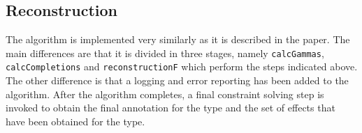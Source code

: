 \documentclass[8pt]{extarticle}
\begin{document}
\subsection{Reconstruction}
The algorithm is implemented very similarly as it is described in the paper. The main differences are that it is divided in three stages, namely \verb+calcGammas+, \verb+calcCompletions+ and \verb+reconstructionF+ which perform the steps indicated above. The other difference is that a logging and error reporting has been added to the algorithm. After the algorithm completes, a final constraint solving step is invoked to obtain the final annotation for the type and the set of effects that have been obtained for the type.
\end{document}
